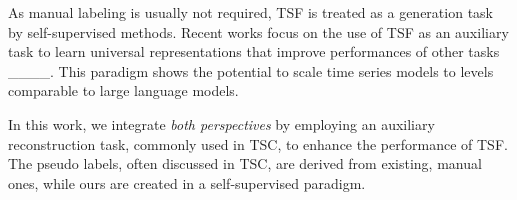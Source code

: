 As manual labeling is usually not required, TSF is treated as a generation task by self-supervised methods.
Recent works focus on the use of TSF as an auxiliary task to learn universal representations that improve performances of other tasks ____. This paradigm shows the potential to scale time series models to levels comparable to large language models. 

In this work, we integrate \emph{both perspectives} by employing an auxiliary reconstruction task, commonly used in TSC, to enhance the performance of TSF. 
The pseudo labels, often discussed in TSC, are derived from existing, manual ones, while ours are created in a self-supervised paradigm.
